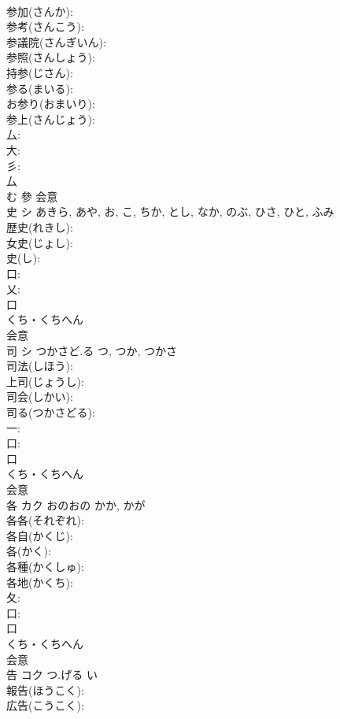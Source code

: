 \documentclass[8pt]{extreport}
\begin{document}
\begin{CJK}{UTF8}{min}
\\	参加(さんか): 
\\	参考(さんこう): 
\\	参議院(さんぎいん): 
\\	参照(さんしょう): 
\\	持参(じさん): 
\\	参る(まいる): 
\\	お参り(おまいり): 
\\	参上(さんじょう): 
\\	厶: 
\\	大: 
\\	彡: 
\\	厶	
\\	む	參	会意 
\\	史	シ		あきら, あや, お, こ, ちか, とし, なか, のぶ, ひさ, ひと, ふみ	
\\	歴史(れきし): 
\\	女史(じょし): 
\\	史(し): 
\\	口: 
\\	乂: 
\\	口	
\\	くち・くちへん	
\\	会意 
\\	司	シ	つかさど.る	つ, つか, つかさ	
\\	司法(しほう): 
\\	上司(じょうし): 
\\	司会(しかい): 
\\	司る(つかさどる): 
\\	一: 
\\	口: 
\\	口	
\\	くち・くちへん	
\\	会意 
\\	各	カク	おのおの	かか, かが	
\\	各各(それぞれ): 
\\	各自(かくじ): 
\\	各(かく): 
\\	各種(かくしゅ): 
\\	各地(かくち): 
\\	夂: 
\\	口: 
\\	口	
\\	くち・くちへん	
\\	会意 
\\	告	コク	つ.げる	い	
\\	報告(ほうこく): 
\\	広告(こうこく): 

\end{CJK}
\end{document}
